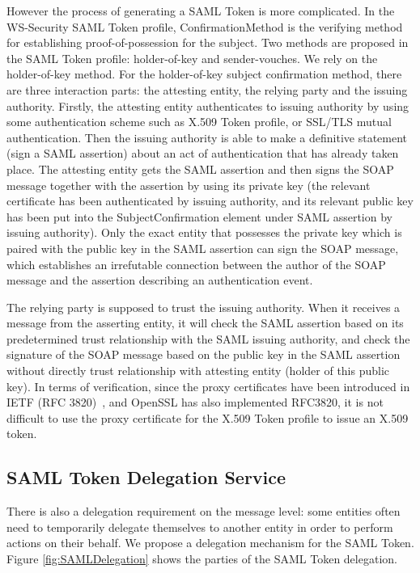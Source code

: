\documentclass[twocolumn]{svjour3}         %
\begin{document}
However the process of generating a SAML Token is more complicated. In the WS-Security SAML Token profile, ConfirmationMethod is the verifying method for establishing proof-of-possession for the subject. Two methods are proposed in the SAML Token profile: holder-of-key and sender-vouches. We rely on the holder-of-key method. For the holder-of-key subject confirmation method, there are three interaction parts: the attesting entity, the relying party and the issuing authority. Firstly, the attesting entity authenticates to issuing authority by using some authentication scheme such as X.509 Token profile, or SSL/TLS mutual authentication. Then the issuing authority is able to make a definitive statement (sign a SAML assertion) about an act of authentication that has already taken place. The attesting entity gets the SAML assertion and then signs the SOAP message together with the assertion by using its private key (the relevant certificate has been authenticated by issuing authority, and its relevant public key has been put into the SubjectConfirmation element under SAML assertion by issuing authority). Only the exact entity that possesses the private key which is paired with the public key in the SAML assertion can sign the SOAP message, which establishes an irrefutable connection between the author of the SOAP message and the assertion describing an authentication event.

The relying party is supposed to trust the issuing authority. When it receives a message from the asserting entity, it will check the SAML assertion based on its predetermined trust relationship with the SAML issuing authority, and check the signature of the SOAP message based on the public key in the SAML assertion without directly trust relationship with attesting entity (holder of this public key).
In terms of verification, since the proxy certificates have been introduced in IETF (RFC 3820)~\cite{RFC3820link}, and OpenSSL has also implemented RFC3820, it is not difficult to use the proxy certificate for the X.509 Token profile to issue an X.509 token.


\subsection{SAML Token Delegation Service}
\label{sec:samldeleg}
There is also a delegation requirement on the message level: some entities often need to temporarily delegate themselves to another entity in order to perform actions on their behalf. We propose a delegation mechanism for the SAML Token. Figure \ref{fig:SAMLDelegation} shows the parties of the SAML Token delegation.
\end{document}
